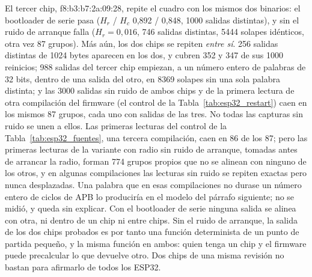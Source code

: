El tercer chip, f8:b3:b7:2a:09:28, repite el cuadro con los mismos dos
binarios: el bootloader de serie pasa ($H_r$ / $H_c$ 0,892 / 0,848, 1000
salidas distintas), y sin el ruido de arranque falla ($H_r = 0{,}016$,
746 salidas distintas, 5444 solapes idénticos, otra vez 87 grupos). Más
aún, los dos chips se repiten \emph{entre sí}. 256 salidas distintas de
1024 bytes aparecen en los dos, y cubren 352 y 347 de sus 1000 reinicios;
988 salidas del tercer chip empiezan, a un número entero de palabras de
32 bits, dentro de una salida del otro, en 8369 solapes sin una sola
palabra distinta; y las 3000 salidas sin ruido de ambos chips y de la
primera lectura de otra compilación del firmware (el control de la
Tabla~\ref{tab:esp32_restart}) caen en los mismos 87 grupos, cada uno con
salidas de las tres. No todas las capturas sin ruido se unen a ellos.
Las primeras lecturas del control de la Tabla~\ref{tab:esp32_fuentes},
una tercera compilación, caen en 86 de los 87; pero las primeras
lecturas de la variante con radio sin ruido de arranque, tomadas antes
de arrancar la radio, forman 774 grupos propios que no se alinean con
ninguno de los otros, y en algunas compilaciones las lecturas sin ruido
se repiten exactas pero nunca desplazadas. Una palabra que en esas
compilaciones no durase un número entero de ciclos de APB lo produciría
en el modelo del párrafo siguiente; no se midió, y queda sin explicar. Con el bootloader de serie ninguna salida se alinea
con otra, ni dentro de un chip ni entre chips. Sin el ruido de arranque,
la salida de los dos chips probados es por tanto una función
determinista de un punto de partida pequeño, y la misma función en
ambos: quien tenga un chip y el firmware puede precalcular lo que
devuelve otro. Dos chips de una misma revisión no bastan para afirmarlo
de todos los ESP32.

